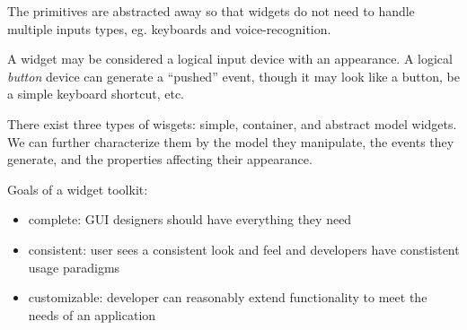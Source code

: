 \documentclass[12pt]{article}
\begin{document}
The primitives are abstracted away so that widgets do not need to handle multiple inputs types, eg. keyboards and voice-recognition.

A widget may be considered a logical input device with an appearance. A logical \emph{button} device can generate a ``pushed'' event, though it may look like a button, be a simple keyboard shortcut, etc.

There exist three types of wisgets: simple, container, and abstract model widgets. We can further characterize them by the model they manipulate, the events they generate, and the properties affecting their appearance.

Goals of a widget toolkit:
\begin{itemize}
\item complete: GUI designers should have everything they need
\item consistent: user sees a consistent look and feel and developers have constistent usage paradigms
\item customizable: developer can reasonably extend functionality to meet the needs of an application
\end{itemize}
\end{document}
